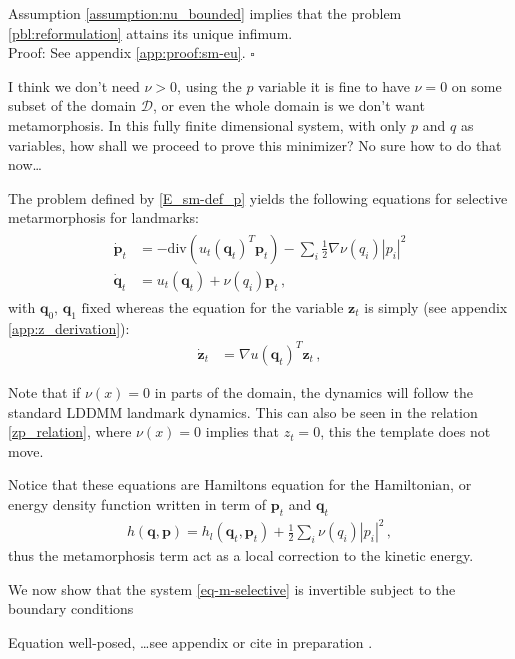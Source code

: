 \documentclass[runningheads]{llncs}
\newcommand{\mdiv}{\text{div}}
\begin{document}
\begin{theorem}\label{sm-eu}
Assumption \ref{assumption:nu_bounded} implies that the problem
\eqref{pbl:reformulation} attains its unique infimum.\\

Proof: See appendix \ref{app:proof:sm-eu}.
{\hfill $\square$}
\end{theorem}
{\color{red} I think we don't need $\nu>0$, using the $p$ variable it is fine to have $\nu=0$ on some subset of the domain $\mathcal D$, or even the whole domain is we don't want metamorphosis. 
In this fully finite dimensional system, with only $p$ and $q$ as variables, how shall we proceed to prove this minimizer? No sure how to do that now\dots
}

The problem defined by \eqref{E_sm-def_p} yields the following equations for
selective metarmorphosis for landmarks:
\begin{align}
  \begin{split}
  \dot{\mathbf p}_t &= - \mdiv(u_t(\mathbf q_t)^T \mathbf p_t) - \sum_i \frac12
  \nabla \nu(q_i) |p_i|^2\\ \dot{\mathbf q}_t &= u_t(\mathbf q_t) +
  \nu(q_i)\mathbf p_t \,,
\end{split}
  \label{eq-m-selective}
\end{align}
with $\mathbf q_0,\, \mathbf q_1 \text{ fixed}$ whereas the equation for the
variable $\mathbf z_t$ is simply (see appendix \ref{app:z_derivation}):
\begin{align}
  \dot  {\mathbf z}_t&= \nabla u(\mathbf q_t)^T \mathbf z_t\,, 
\end{align}

Note that if $\nu(x)=0$ in parts of the domain, the dynamics will follow
the standard LDDMM landmark dynamics. This can also be seen in the relation 
\eqref{zp_relation}, where $\nu(x)=0$  implies that $z_t=0$, this the template
does not move. 

Notice that these equations are Hamiltons equation for the Hamiltonian, or
energy density function written in term of $\mathbf p_t$ and $\mathbf q_t$
\begin{align}
  h(\mathbf q, \mathbf p) = h_l(\mathbf q_t, \mathbf p_t)+ \frac12 \sum_i \nu(q_i) |p_i|^2\,,  
\end{align}
thus the metamorphosis term act as a local correction to the kinetic energy. 

We now show that the system \eqref{eq-m-selective} is invertible subject to the
boundary conditions
\begin{theorem}
Equation well-posed, \dots see appendix or cite in preparation
\cite{bockarnaudoncotter2019}.
\end{theorem}
\end{document}
